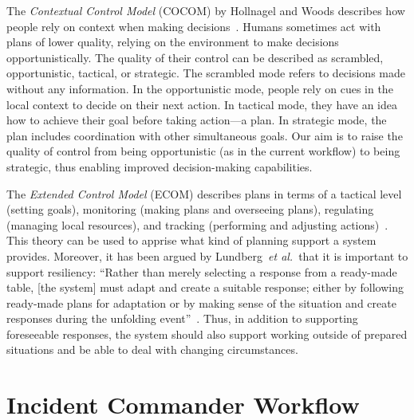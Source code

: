 \documentclass{egpubl}
\def\etal{\textit{et al.}}
\begin{document}
The \emph{Contextual Control Model} (COCOM) by Hollnagel and Woods describes how people rely on context when making decisions~\cite{hollnagel2005joint}. Humans sometimes act with plans of lower quality, relying on the environment to make decisions opportunistically. The quality of their control can be described as scrambled, opportunistic, tactical, or strategic. The scrambled mode refers to decisions made without any information. In the opportunistic mode, people rely on cues in the local context to decide on their next action. In tactical mode, they have an idea how to achieve their goal before taking action---a plan. In strategic mode, the plan includes coordination with other simultaneous goals. Our aim is to raise the quality of control from being opportunistic (as in the current workflow) to being strategic, thus enabling improved decision-making capabilities.

The \emph{Extended Control Model} (ECOM) describes plans in terms of a tactical level (setting goals), monitoring (making plans and overseeing plans), regulating (managing local resources), and tracking (performing and adjusting actions)~\cite{hollnagel2005joint}. This theory can be used to apprise what kind of planning support a system provides.  Moreover, it has been argued by Lundberg~\etal\ that it is important to support resiliency: ``Rather than merely selecting a response from a ready-made table, [the system] must adapt and create a suitable response; either by following ready-made plans for adaptation or by making sense of the situation and create responses during the unfolding event''~\cite{Lundberg2012}. Thus, in addition to supporting foreseeable responses, the system should also support working outside of prepared situations and be able to deal with changing circumstances.


\section{Incident Commander Workflow} \label{sec:workflow}
\end{document}
